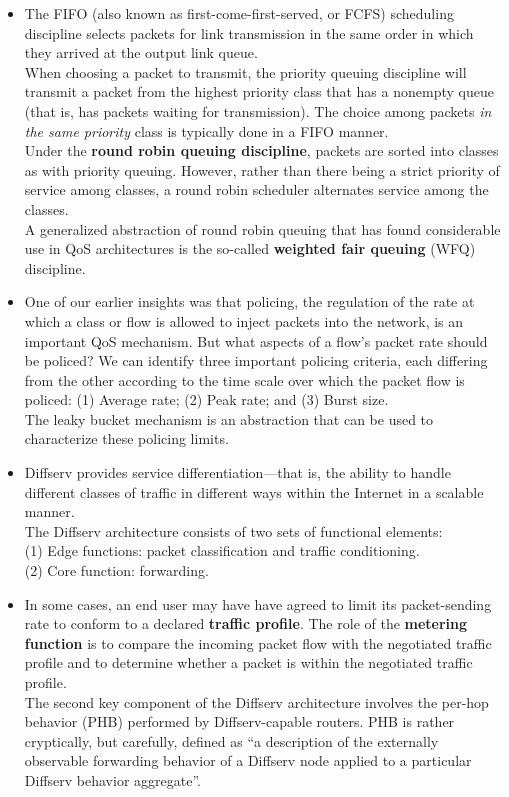 \begin{itemize}
\item
The FIFO (also known as first-come-first-served, or FCFS) scheduling discipline selects packets for link transmission in the same order in which they arrived at the output link queue.\\
When choosing a packet to transmit, the priority queuing discipline will transmit a packet from the highest priority class that has a nonempty queue (that is, has packets waiting for transmission). The choice among packets \textit{in the same priority} class is typically done in a FIFO manner.\\
Under the \textbf{round robin queuing discipline}, packets are sorted into classes as with priority queuing. However, rather than there being a strict priority of service among classes, a round robin scheduler alternates service among the classes.\\
A generalized abstraction of round robin queuing that has found considerable use in QoS architectures is the so-called \textbf{weighted fair queuing} (WFQ) discipline.

\item
One of our earlier insights was that policing, the regulation of the rate at which a class or flow is allowed to inject packets into the network, is an important QoS mechanism. But what aspects of a flow's packet rate should be policed? We can identify three important policing criteria, each differing from the other according to the time scale over which the packet flow is policed: (1) Average rate; (2) Peak rate; and (3) Burst size.\\
The leaky bucket mechanism is an abstraction that can be used to characterize these policing limits.

\item
Diffserv provides service differentiation---that is, the ability to handle different classes of traffic in different ways within the Internet in a scalable manner.\\
The Diffserv architecture consists of two sets of functional elements:\\
\hspace*{1em}(1) Edge functions: packet classification and traffic conditioning.\\
\hspace*{1em}(2) Core function: forwarding.

\item
In some cases, an end user may have have agreed to limit its packet-sending rate to conform to a declared \textbf{traffic profile}. The role of the \textbf{metering function} is to compare the incoming packet flow with the negotiated traffic profile and to determine whether a packet is within the negotiated traffic profile.\\
The second key component of the Diffserv architecture involves the per-hop behavior (PHB) performed by Diffserv-capable routers. PHB is rather cryptically, but carefully, defined as ``a description of the externally observable forwarding behavior of a Diffserv node applied to a particular Diffserv behavior aggregate''.


\end{itemize}
